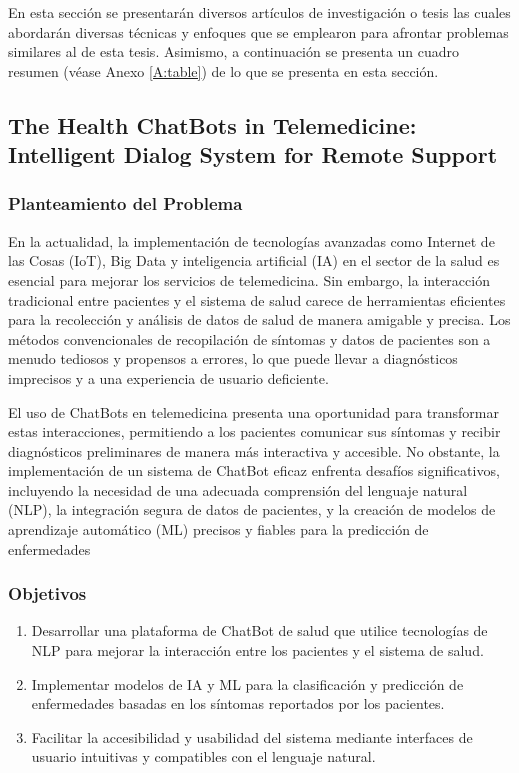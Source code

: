 En esta sección se presentarán diversos artículos de investigación o tesis las cuales abordarán diversas técnicas y enfoques que se emplearon para afrontar problemas similares al de esta tesis. Asimismo, a continuación se presenta un cuadro resumen (véase Anexo \ref{A:table}) de lo que se presenta en esta sección.


\subsection{The Health ChatBots in Telemedicine: Intelligent Dialog System for Remote Support \citep*{HealthChatBots-2022}}
	\subsubsection{Planteamiento del Problema}
		En la actualidad, la implementación de tecnologías avanzadas como Internet de las Cosas (IoT), Big Data y inteligencia artificial (IA) en el sector de la salud es esencial para mejorar los servicios de telemedicina. Sin embargo, la interacción tradicional entre pacientes y el sistema de salud carece de herramientas eficientes para la recolección y análisis de datos de salud de manera amigable y precisa. Los métodos convencionales de recopilación de síntomas y datos de pacientes son a menudo tediosos y propensos a errores, lo que puede llevar a diagnósticos imprecisos y a una experiencia de usuario deficiente.
		
		El uso de ChatBots en telemedicina presenta una oportunidad para transformar estas interacciones, permitiendo a los pacientes comunicar sus síntomas y recibir diagnósticos preliminares de manera más interactiva y accesible. No obstante, la implementación de un sistema de ChatBot eficaz enfrenta desafíos significativos, incluyendo la necesidad de una adecuada comprensión del lenguaje natural (NLP), la integración segura de datos de pacientes, y la creación de modelos de aprendizaje automático (ML) precisos y fiables para la predicción de enfermedades
	
	\subsubsection{Objetivos}
		\begin{enumerate}
			\item Desarrollar una plataforma de ChatBot de salud que utilice tecnologías de NLP para mejorar la interacción entre los pacientes y el sistema de salud.\vspace{-2mm}
			\item Implementar modelos de IA y ML para la clasificación y predicción de enfermedades basadas en los síntomas reportados por los pacientes.\vspace{-2mm}
			\item Facilitar la accesibilidad y usabilidad del sistema mediante interfaces de usuario intuitivas y compatibles con el lenguaje natural.\vspace{-2mm}
		\end{enumerate}
			

